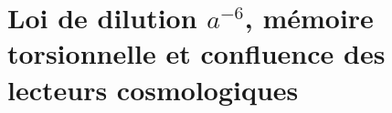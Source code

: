 \section{Loi de dilution \(a^{-6}\), mémoire torsionnelle et confluence des lecteurs cosmologiques}

